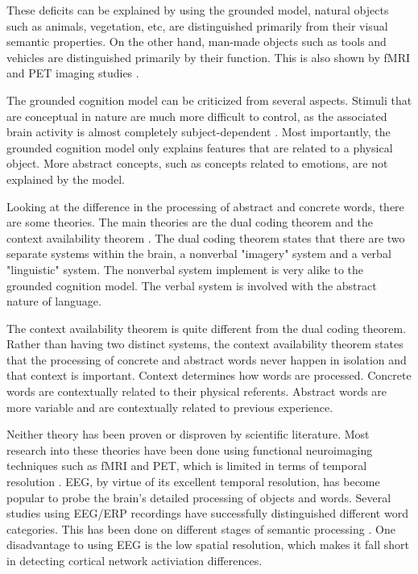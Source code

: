 These deficits can be explained by using the grounded model, natural objects such as animals, vegetation, etc, are distinguished primarily from their visual semantic properties. On the other hand, man-made objects such as tools and vehicles are distinguished primarily by their function. This is also shown by fMRI and PET imaging studies \cite{devlin2002there}.

The grounded cognition model can be criticized from several aspects. Stimuli that are conceptual in nature are much more difficult to control, as the associated brain activity is almost completely subject-dependent \cite{kemmerer2015visual}. Most importantly, the grounded cognition model only explains features that are related to a physical object. More abstract concepts, such as concepts related to emotions, are not explained by the model. 

Looking at the difference in the processing of abstract and concrete words, there are some theories. The main theories are the dual coding theorem and the context availability theorem \cite{kounios1994concreteness, wang2010neural}. The dual coding theorem states that there are two separate systems within the brain, a nonverbal "imagery" system and a verbal "linguistic" system. The nonverbal system implement is very alike to the grounded cognition model. The verbal system is involved with the abstract nature of language.

The context availability theorem is quite different from the dual coding theorem. Rather than having two distinct systems, the context availability theorem states that the processing of concrete and abstract words never happen in isolation and that context is important. Context determines how words are processed. Concrete words are contextually related to their physical referents. Abstract words are more variable and are contextually related to previous experience. 

Neither theory has been proven or disproven by scientific literature. Most research into these theories have been done using functional neuroimaging techniques such as fMRI and PET, which is limited in terms of temporal resolution \cite{bookheimer2002functional}. EEG, by virtue of its excellent temporal resolution, has become popular to probe the brain's detailed processing of objects and words. Several studies using EEG/ERP recordings have successfully distinguished different word categories. This has been done on different stages of semantic processing \cite{hauk2006time}. One disadvantage to using EEG is the low spatial resolution, which makes it fall short in detecting cortical network activiation differences. 

